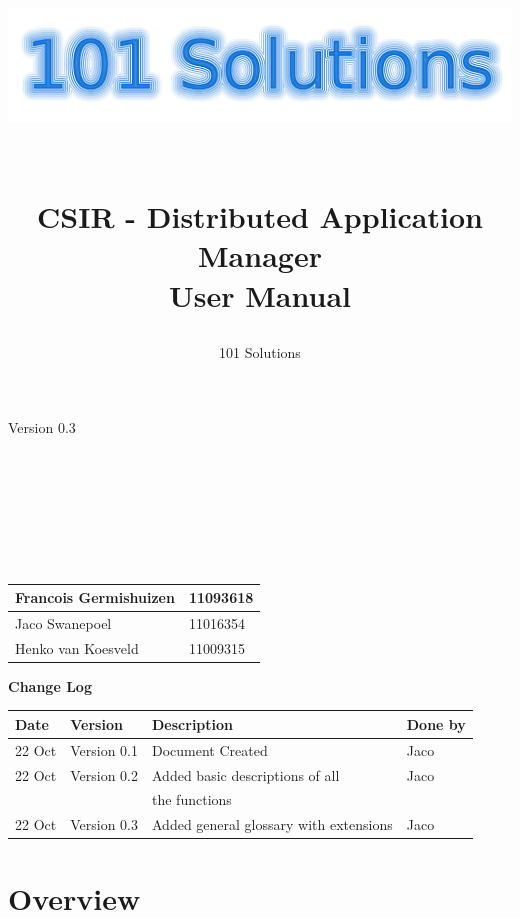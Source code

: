 \documentclass[a4paper,12pt,final]{article}
\title{
\begin{center}
  	\includegraphics[scale=0.3]{101Logo.png} 
  \end{center}
  \textbf{\\}
CSIR - Distributed Application Manager\\
User Manual\\
}
\author{101 Solutions}
\begin{document}
\maketitle
\begin{center}
Version 0.3
\end{center}
\textbf{\\}
\textbf{\\}
\textbf{\\}
\textbf{\\}
\textbf{\\}
\textbf{\\}
\begin{center}
\begin{tabular}{|l|l|}
\hline
Francois Germishuizen & 11093618\\
\hline
Jaco Swanepoel & 11016354\\
\hline
Henko van Koesveld & 11009315\\
\hline
\end{tabular}
\end{center}
\thispagestyle{empty}
\newpage
\thispagestyle{empty}
\textbf{\large{Change Log}}
\vspace{6pt}\newline
\begin{tabular}{|l|l|l|l|}
\hline
\textbf{Date} & \textbf{Version} & \textbf{Description} & \textbf{Done by}\\
\hline
22 Oct & Version 0.1 & Document Created & Jaco\\
\hline
22 Oct & Version 0.2 & Added basic descriptions of all  & Jaco\\
&&the functions&\\
\hline
22 Oct & Version 0.3 & Added general glossary with extensions & Jaco\\
\hline
\end{tabular}
\newpage
\tableofcontents
\thispagestyle{empty}
\newpage

\section{Overview}
\end{document}
